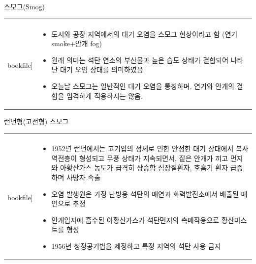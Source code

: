 \begin{frame}[t]{스모그(Smog)}
	\begin{tabular}{ll}
		\begin{minipage}[t]{0.3\textwidth}\scriptsize
			\begin{figure}[t]
				\texttt{[image: \\bookfile]}
			\end{figure}
		\end{minipage}	
		&
		\begin{minipage}[t]{0.65\textwidth} \scriptsize	
			\begin{itemize}
				\item 도시와 공장 지역에서의 대기 오염을 스모그 현상이라고 함 (연기 smoke+안개 fog)
				\item 원래 의미는 석탄 연소의 부산물과 높은 습도 상태가 결합되어 나타난 대기 오염 상태를  의미하였음
				\item 오늘날 스모그는 일반적인 대기 오염을 통칭하며, 연기와 안개의 결합을 엄격하게 적용하지는 않음.
				
				
			\end{itemize}

		\end{minipage}
	\end{tabular}
\end{frame}



\begin{frame}[t]{런던형(고전형) 스모그}
	\begin{tabular}{ll}
		\begin{minipage}[t]{0.3\textwidth}\scriptsize
			\begin{figure}[t]
				\texttt{[image: \\bookfile]}
			\end{figure}
		\end{minipage}	
		&
		\begin{minipage}[t]{0.65\textwidth} \scriptsize	
			\begin{itemize}
				\item 1952년 런던에서는 고기압의 정체로 인한 안정한 대기 상태에서 복사역전층이 형성되고 무풍 상태가 지속되면서, 짙은 안개가 끼고 먼지와 아황산가스 농도가 급격히 상승함
				심장질환자, 호흡기 환자 급증하며 사망자 속출
				\item 오염 발생원은 가정 난방용 석탄의 매연과 화력발전소에서 배출된 매연으로 추정
				\item 안개입자에 흡수된 아황산가스가 석탄먼지의 촉매작용으로 황산미스트를 형성
				\item 1956년 청정공기법을 제정하고 특정 지역의 석탄 사용 금지
					
			\end{itemize}

		\end{minipage}
	\end{tabular}
\end{frame}




